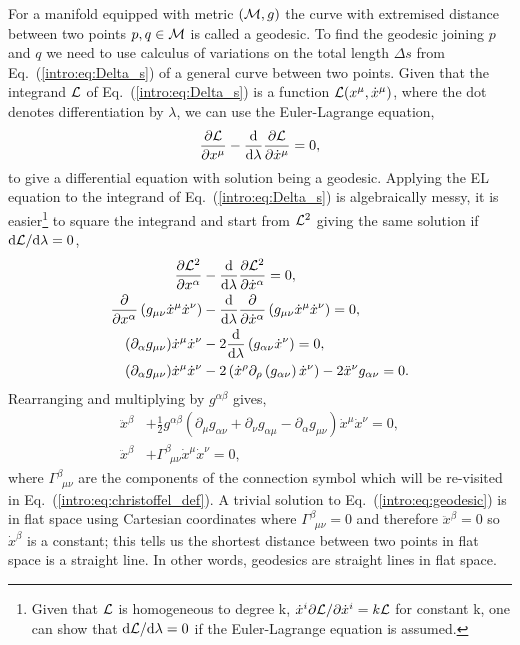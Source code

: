  For a manifold equipped with metric $(\mathcal{M},g)$ the curve with \color{orchid} extremised \color{black} distance between two points $p,q\in\mathcal{M}$ is called a geodesic. To find the geodesic joining $p$ and $q$ we need to use calculus of variations on the total length $\Delta s$ from Eq.~(\ref{intro:eq:Delta_s}) of a general curve between two points. Given that the integrand $\mathcal{L}$ of Eq.~(\ref{intro:eq:Delta_s}) is a function $\mathcal{L}(x^\mu,\dot{x}^\mu)$, where the dot denotes differentiation by $\lambda$, we can use the Euler-Lagrange equation,
\begin{align}
\frac{\partial{\mathcal{L}}}{\partial x^\mu} - \frac{\dd}{\dd \lambda}\frac{\partial \mathcal{L}}{\partial \dot{x}^\mu} = 0,
\end{align}
to give a differential equation with solution being a geodesic. Applying the EL equation to the integrand of Eq.~(\ref{intro:eq:Delta_s}) is algebraically messy, it is easier\footnote{Given that $\mathcal{L}$ is homogeneous to degree k, $\dot{x}^i \partial \mathcal{L} / \partial \dot{x}^i = k\mathcal{L}$ for constant k, one can show that $\dd\mathcal{L}/\dd\lambda=0$ if the Euler-Lagrange equation is assumed.} to square the integrand and start from $\mathcal{L}^2$ giving the same solution if $\dd \mathcal{L} / \dd \lambda=0$,
\begin{align}
\frac{\partial{\mathcal{L}^2}}{\partial x^\alpha} &- \frac{\dd}{\dd \lambda}\frac{\partial \mathcal{L}^2}{\partial \dot{x}^\alpha} = 0, \\
\frac{\partial}{\partial x^\alpha} \left(g_{\mu\nu}\dot{x}^\mu\dot{x}^\nu\right) &- \frac{\dd}{\dd \lambda}\frac{\partial }{\partial \dot{x}^\alpha}\left(g_{\mu\nu}\dot{x}^\mu\dot{x}^\nu\right) = 0, \\
(\partial_\alpha g_{\mu\nu})\dot{x}^\mu\dot{x}^\nu &- 2\frac{\dd}{\dd \lambda}\left(g_{\alpha\nu}\dot{x}^\nu\right) = 0, \\
(\partial_\alpha g_{\mu\nu})\dot{x}^\mu\dot{x}^\nu &- 2\left(\dot{x}^\rho \partial_\rho \left(g_{\alpha\nu}\right)\dot{x}^\nu\right) - 2\ddot{x}^\nu g_{\alpha\nu} =0.
\end{align}
Rearranging and multiplying by $g^{\alpha\beta}$ gives,
\begin{align}
\ddot{x}^\beta &+ \frac{1}{2}g^{\alpha\beta}\left(\partial_{\mu}g_{\alpha\nu} +\partial_{\nu}g_{\alpha\mu} -\partial_{\alpha}g_{\mu\nu} \right)\dot{x}^\mu\dot{x}^\nu=0,\\
 \ddot{x}^\beta &+ \Gamma^\beta_{\,\,\,\mu\nu}\dot{x}^\mu\dot{x}^\nu=0, \label{intro:eq:geodesic}
\end{align}
where $\Gamma^\beta_{\,\,\,\mu\nu}$ \color{orchid} are the components of the connection symbol which will be re-visited in Eq.~(\ref{intro:eq:christoffel_def}). \color{black} A trivial solution to Eq.~(\ref{intro:eq:geodesic}) is in flat space using Cartesian coordinates where $\Gamma^\beta_{\,\,\,\mu\nu}=0$ and therefore $\ddot{x}^\beta=0$ so $\dot{x}^\beta$ is a constant; this tells us the shortest distance between two points in flat space is a straight line. In other words, geodesics are straight lines in flat space.


